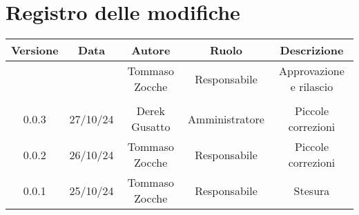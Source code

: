 
\section*{Registro delle modifiche}
\begin{table}[H]
    \begin{tabular}{|c|c|c|c|c|}
        \hline
         \textbf{Versione} &  \textbf{Data} &  \textbf{Autore} &  \textbf{Ruolo} & \textbf{Descrizione} \\
          \hline
          &  & Tommaso Zocche & Responsabile & Approvazione e rilascio\\
          \hline
          &  &  &  &  \\
          \hline
          0.0.3 & 27/10/24 & Derek Gusatto & Amministratore & Piccole correzioni \\
          \hline
          0.0.2 & 26/10/24 & Tommaso Zocche & Responsabile & Piccole correzioni \\
          \hline
          0.0.1 & 25/10/24 & Tommaso Zocche & Responsabile & Stesura \\
          \hline
    \end{tabular}
\end{table}